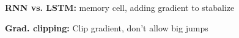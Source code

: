 \textbf{RNN vs. LSTM:} memory cell, adding gradient to stabalize\\

\textbf{Grad. clipping:} Clip gradient, don't allow big jumps\\

